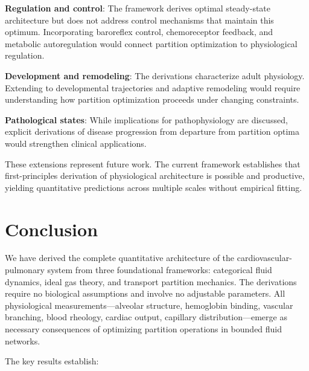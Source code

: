 \documentclass[12pt,a4paper]{article}
\theoremstyle{remark}
\begin{document}
\textbf{Regulation and control}: The framework derives optimal steady-state architecture but does not address control mechanisms that maintain this optimum. Incorporating baroreflex control, chemoreceptor feedback, and metabolic autoregulation would connect partition optimization to physiological regulation.

\textbf{Development and remodeling}: The derivations characterize adult physiology. Extending to developmental trajectories and adaptive remodeling would require understanding how partition optimization proceeds under changing constraints.

\textbf{Pathological states}: While implications for pathophysiology are discussed, explicit derivations of disease progression from departure from partition optima would strengthen clinical applications.

These extensions represent future work. The current framework establishes that first-principles derivation of physiological architecture is possible and productive, yielding quantitative predictions across multiple scales without empirical fitting.

\section{Conclusion}

We have derived the complete quantitative architecture of the cardiovascular-pulmonary system from three foundational frameworks: categorical fluid dynamics, ideal gas theory, and transport partition mechanics. The derivations require no biological assumptions and involve no adjustable parameters. All physiological measurements—alveolar structure, hemoglobin binding, vascular branching, blood rheology, cardiac output, capillary distribution—emerge as necessary consequences of optimizing partition operations in bounded fluid networks.

The key results establish:
\end{document}
